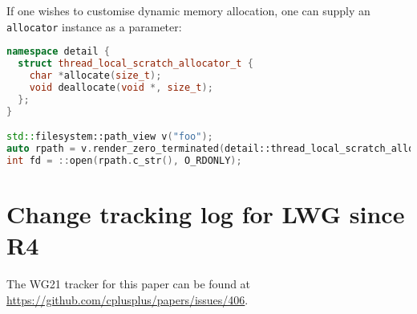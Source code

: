\documentclass[11pt]{article}
\newcommand{\code}[2][cpp]{\lstinline[language=#1,basicstyle=\small\ttfamily]{#2}}
\begin{document}
\begin{itemize}
    If one wishes to customise dynamic memory allocation, one can supply an \code{allocator} instance as a parameter:

    \begin{lstlisting}[language=cpp]
namespace detail {
  struct thread_local_scratch_allocator_t {
    char *allocate(size_t);
    void deallocate(void *, size_t);
  };
}

std::filesystem::path_view v("foo");
auto rpath = v.render_zero_terminated(detail::thread_local_scratch_allocator_t{});
int fd = ::open(rpath.c_str(), O_RDONLY);
    \end{lstlisting}
\end{itemize}

\section{Change tracking log for LWG since R4}

The WG21 tracker for this paper can be found at \url{https://github.com/cplusplus/papers/issues/406}.
\end{document}
